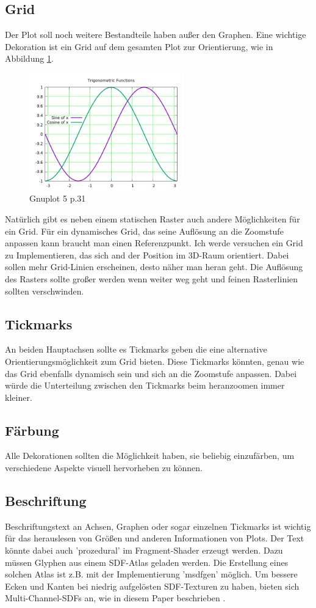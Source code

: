 \subsection{Grid}
Der Plot soll noch weitere Bestandteile haben außer den Graphen.
Eine wichtige Dekoration ist ein Grid auf dem gesamten Plot zur Orientierung, wie in Abbildung \ref{fig:grid}.
\begin{figure}[ht]
	\centering
	\includegraphics[width=0.6\textwidth]{fig/grid.png}
	\caption{Gnuplot 5 \cite{Phillips2020} p.31}
	\label{fig:grid}
\end{figure}
\FloatBarrier
Natürlich gibt es neben einem statischen Raster auch andere Möglichkeiten für ein Grid.
Für ein dynamisches Grid, das seine Auflösung an die Zoomstufe anpassen kann braucht man einen Referenzpunkt.
Ich werde versuchen ein Grid zu Implementieren, das sich and der Position im 3D-Raum orientiert.
Dabei sollen mehr Grid-Linien erscheinen, desto näher man heran geht.
Die Auflösung des Rasters sollte großer werden wenn weiter weg geht und feinen Rasterlinien sollten verschwinden.
\subsection{Tickmarks}
An beiden Hauptachsen sollte es Tickmarks geben die eine alternative Orientierungsmöglichkeit zum Grid bieten.
Diese Tickmarks könnten, genau wie das Grid ebenfalls dynamisch sein und sich an die Zoomstufe anpassen.
Dabei würde die Unterteilung zwischen den Tickmarks beim heranzoomen immer kleiner.
\subsection{Färbung}
Alle Dekorationen sollten die Möglichkeit haben, sie beliebig einzufärben, um verschiedene Aspekte visuell hervorheben zu können.
\subsection{Beschriftung}
Beschriftungstext an Achsen, Graphen oder sogar einzelnen Tickmarks ist wichtig für das herauslesen von Größen und anderen Informationen von Plots.
Der Text könnte dabei auch 'prozedural' im Fragment-Shader erzeugt werden.
Dazu müssen Glyphen aus einem SDF-Atlas geladen werden.
Die Erstellung eines solchen Atlas ist z.B. mit der Implementierung 'msdfgen' \cite{msdfgen2021} möglich.
Um bessere Ecken und Kanten bei niedrig aufgelösten SDF-Texturen zu haben, bieten sich Multi-Channel-SDFs an, wie in diesem Paper beschrieben \cite{Green2007}.

